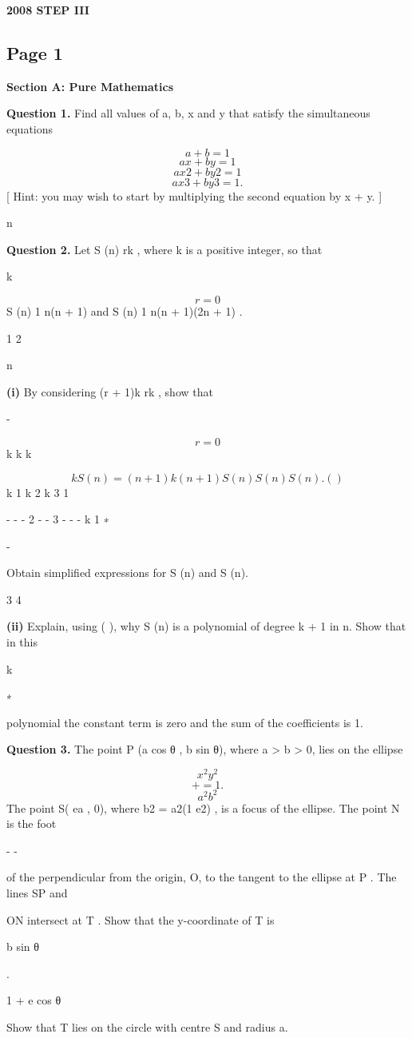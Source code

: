 \documentclass[12pt]{article}
\begin{document}
\begin{center}
{\Large \textbf{2008 STEP III}}
\end{center}

\subsection*{Page 1}
\begin{flushleft}
\bigskip\textbf{Section A: Pure Mathematics}\par
\bigskip\textbf{Question 1.} Find all values of a, b, x and y that satisfy the simultaneous equations\par
\[a + b = 1\]
\[ax + by = 1\]
\[ax2 + by2 = 1\]
\[ax3 + by3 = 1 .\]
[ Hint: you may wish to start by multiplying the second equation by x + y. ]\par
n\par
\bigskip\textbf{Question 2.} Let S (n) rk , where k is a positive integer, so that\par
k\par
\equiv\par
\[r=0\]
S (n) 1 n(n + 1) and S (n) 1 n(n + 1)(2n + 1) .\par
1  2 \par
n\par
\textbf{(i)} By considering (r + 1)k rk , show that\par
-\par
\[r=0\]
k k k\par
\[kS (n) = (n + 1)k (n + 1) S (n) S (n) S (n) . ( )\]
k 1 k 2 k 3 1\par
- - - 2 - - 3 - - \cdots - k 1 ∗\par
-\par
Obtain simplified expressions for S (n) and S (n).\par
3 4\par
\textbf{(ii)} Explain, using ( ), why S (n) is a polynomial of degree k + 1 in n. Show that in this\par
k\par
∗\par
polynomial the constant term is zero and the sum of the coefficients is 1.\par
\bigskip\textbf{Question 3.} The point P (a cos θ , b sin θ), where a > b > 0, lies on the ellipse\par
\[x^2 y^2\]
\[+ = 1 .\]
\[a^2 b^2\]
The point S( ea , 0), where b2 = a2(1 e2) , is a focus of the ellipse. The point N is the foot\par
- -\par
of the perpendicular from the origin, O, to the tangent to the ellipse at P . The lines SP and\par
ON intersect at T . Show that the y-coordinate of T is\par
b sin θ\par
.\par
1 + e cos θ\par
Show that T lies on the circle with centre S and radius a.\par
\par
  \par
     \par
\end{flushleft}
\end{document}
